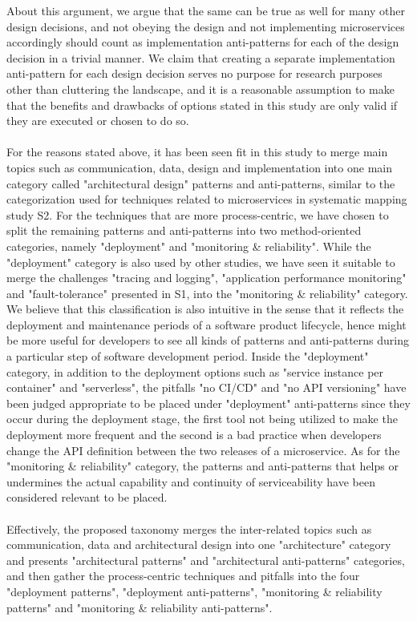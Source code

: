 \documentclass{Configuration_Files/PoliMi3i_thesis}
\begin{document}
About this argument, we argue that the same can be true as well for many other design decisions, and not obeying the design and not implementing microservices accordingly should count as implementation anti-patterns for each of the design decision in a trivial manner.
We claim that creating a separate implementation anti-pattern for each design decision serves no purpose for research purposes other than cluttering the landscape, and it is a reasonable assumption to make that the benefits and drawbacks of options stated in this study are only valid if they are executed or chosen to do so.
\\
\\
For the reasons stated above, it has been seen fit in this study to merge main topics such as communication, data, design and implementation into one main category called "architectural design" patterns and anti-patterns, similar to the categorization used for techniques related to microservices in systematic mapping study S2.
For the techniques that are more process-centric, we have chosen to split the remaining patterns and anti-patterns into two method-oriented categories, namely "deployment" and "monitoring \& reliability".
While the "deployment" category is also used by other studies, we have seen it suitable to merge the challenges "tracing and logging", "application performance monitoring" and "fault-tolerance" presented in S1, into the "monitoring \& reliability" category.
We believe that this classification is also intuitive in the sense that it reflects the deployment and maintenance periods of a software product lifecycle, hence might be more useful for developers to see all kinds of patterns and anti-patterns during a particular step of software development period.
Inside the "deployment" category, in addition to the deployment options such as "service instance per container" and "serverless", the pitfalls "no CI/CD" and "no API versioning" have been judged appropriate to be placed under "deployment" anti-patterns since they occur during the deployment stage, the first tool not being utilized to make the deployment more frequent and the second is a bad practice when developers change the API definition between the two releases of a microservice.
As for the "monitoring \& reliability" category, the patterns and anti-patterns that helps or undermines the actual capability and continuity of serviceability have been considered relevant to be placed.
\\
\\
Effectively, the proposed taxonomy merges the inter-related topics such as communication, data and architectural design into one "architecture" category and presents "architectural patterns" and "architectural anti-patterns" categories, and then gather the process-centric techniques and pitfalls into the four "deployment patterns", "deployment anti-patterns", "monitoring \& reliability patterns" and "monitoring \& reliability anti-patterns".
\\
\end{document}
